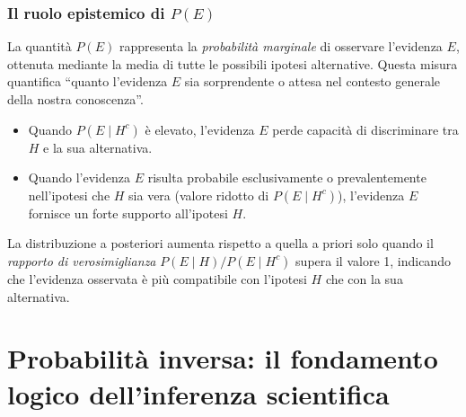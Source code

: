 \documentclass[
  letterpaper,
  DIV=11,
  numbers=noendperiod,
  oneside]{scrreprt}
\providecommand{\tightlist}{%
  \setlength{\itemsep}{0pt}\setlength{\parskip}{0pt}}
\theoremstyle{definition}
\theoremstyle{plain}
\theoremstyle{definition}
\theoremstyle{remark}
\begin{document}
\begin{tcolorbox}[enhanced jigsaw, arc=.35mm, breakable, colbacktitle=quarto-callout-important-color!10!white, opacityback=0, toprule=.15mm, rightrule=.15mm, colback=white, opacitybacktitle=0.6, leftrule=.75mm, coltitle=black, bottomtitle=1mm, left=2mm, toptitle=1mm, title=\textcolor{quarto-callout-important-color}{\faExclamation}\hspace{0.5em}{Interpretazione della probabilità dell'evidenza}, titlerule=0mm, bottomrule=.15mm, colframe=quarto-callout-important-color-frame]

\subsubsection*{\texorpdfstring{Il ruolo epistemico di
\(P(E)\)}{Il ruolo epistemico di P(E)}}\label{il-ruolo-epistemico-di-pe}

La quantità \(P(E)\) rappresenta la \emph{probabilità marginale} di
osservare l'evidenza \(E\), ottenuta mediante la media di tutte le
possibili ipotesi alternative. Questa misura quantifica ``quanto
l'evidenza \(E\) sia sorprendente o attesa nel contesto generale della
nostra conoscenza''.

\begin{itemize}
\tightlist
\item
  Quando \(P(E \mid H^c)\) è elevato, l'evidenza \(E\) perde capacità di
  discriminare tra \(H\) e la sua alternativa.
\item
  Quando l'evidenza \(E\) risulta probabile esclusivamente o
  prevalentemente nell'ipotesi che \(H\) sia vera (valore ridotto di
  \(P(E \mid H^c)\)), l'evidenza \(E\) fornisce un forte supporto
  all'ipotesi \(H\).
\end{itemize}

La distribuzione a posteriori aumenta rispetto a quella a priori solo
quando il \emph{rapporto di verosimiglianza}
\(P(E \mid H) / P(E \mid H^c)\) supera il valore 1, indicando che
l'evidenza osservata è più compatibile con l'ipotesi \(H\) che con la
sua alternativa.

\end{tcolorbox}

\section{Probabilità inversa: il fondamento logico dell'inferenza
scientifica}\label{probabilituxe0-inversa-il-fondamento-logico-dellinferenza-scientifica}
\end{document}
